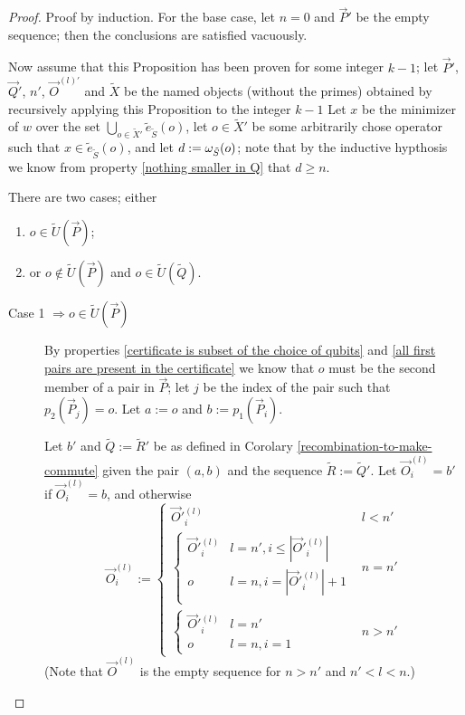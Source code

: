 \documentclass[twocolumn,showpacs,preprintnumbers,amsmath,amssymb,nofootinbib,pra,floatfix]{revtex4-1}
\newcommand{\lst}{\vec}
\newcommand{\set}{\tilde}
\begin{document}
\begin{proof}
Proof by induction.  For the base case, let $n=0$ and $\lst P'$ be the empty sequence;  then the conclusions are satisfied vacuously.

Now assume that this Proposition has been proven for some integer $k-1$;  let $\lst P'$, $\lst Q'$, $n'$, $\lst O^{(l)'}$ and $\set X$ be the named objects (without the primes) obtained by recursively applying this Proposition to the integer $k-1$  Let $x$ be the minimizer of $w$ over the set $\bigcup_{o\in\set X'} \set e_{\set S}(o)$, let $o\in\set X'$ be some arbitrarily chose operator such that $x\in \set e_{\set S}(o)$, and let  $d:=\om_{\set S}(o)$;  note that by the inductive hypthosis we know from property \ref{nothing smaller in Q} that $d\ge n$.

There are two cases;  either
\begin{enumerate}
\item $o\in \set U(\lst P)$;
\item or $o\notin \set U(\lst P)$ and $o\in\set U(\set Q)$.
\end{enumerate}

\begin{description}

\item[Case 1 $\Rightarrow o\in\set U(\lst P)$]
By properties \ref{certificate is subset of the choice of qubits} and \ref{all first pairs are present in the certificate} we know that $o$ must be the second member of a pair in $\lst P$;  let $j$ be the index of the pair such that $p_2(\lst P_j)=o$.  Let $a := o$ and $b := p_1(\lst P_i)$.

Let $b'$ and $\set Q := \set R'$ be as defined in Corolary \ref{recombination-to-make-commute} given the pair $(a,b)$ and the sequence $\set R := \set Q'$.  Let $\lst O^{(l)}_i=b'$ if $\lst O^{(l)}_i=b$, and otherwise 
$$
\lst O^{(l)}_i :=
\begin{cases}
\lst O'^{(l)}_i & l < n'\\
\begin{cases}
\lst O'^{(l)}_i & l = n', i \le |\lst O'^{(l)}_i|\\
o & l = n, i = |\lst O'^{(l)}_i|+1\\
\end{cases} & n = n' \\
\begin{cases}
\lst O'^{(l)}_i & l = n'\\
o & l = n, i = 1
\end{cases} & n > n'
\end{cases}
$$
(Note that $\lst O^{(l)}$ is the empty sequence for $n>n'$ and $n' < l < n$.)


\end{description}
\end{proof}
\end{document}
